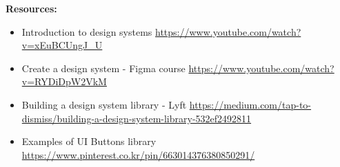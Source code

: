 \textbf{Resources:}

\begin{itemize}
\item Introduction to design systems \url{https://www.youtube.com/watch?v=xEuBCUngJ_U}
\item Create a design system - Figma course \url{https://www.youtube.com/watch?v=RYDiDpW2VkM}
\item Building a design system library - Lyft \url{https://medium.com/tap-to-dismiss/building-a-design-system-library-532ef2492811}
\item Examples of UI Buttons library \url{https://www.pinterest.co.kr/pin/663014376380850291/}
\end{itemize}

